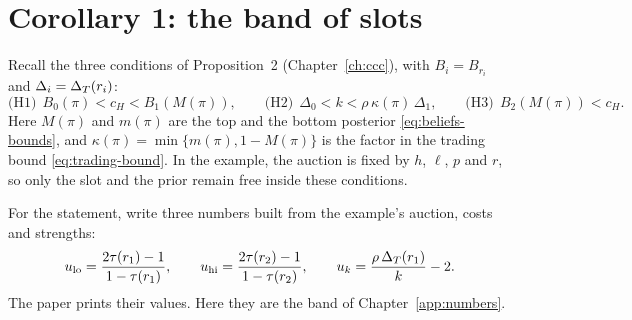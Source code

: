 \section{Corollary 1: the band of slots}\label{sec:example-corollary}

Recall the three conditions of Proposition~2 (Chapter~\ref{ch:ccc}), with \(B_i=B_{r_i}\) and
\(\Delta_i=\Delta_T(r_i)\):
\[
\text{(H1)}\ \ B_0(\pi)<c_H<B_1(M(\pi)),\qquad
\text{(H2)}\ \ \Delta_0<k<\rho\,\kappa(\pi)\,\Delta_1,\qquad
\text{(H3)}\ \ B_2(M(\pi))<c_H.
\]
Here \(M(\pi)\) and \(m(\pi)\) are the top and the bottom posterior \eqref{eq:beliefs-bounds}, and
\(\kappa(\pi)=\min\{m(\pi),1-M(\pi)\}\) is the factor in the trading bound \eqref{eq:trading-bound}. In the example,
the auction is fixed by \(h\), \(\ell\), \(p\) and \(r\), so only the slot and the prior remain free inside these
conditions.

For the statement, write three numbers built from the example's auction, costs and strengths:
\[
u_{\rm lo}=\frac{2\tau(r_1)-1}{1-\tau(r_1)},\qquad
u_{\rm hi}=\frac{2\tau(r_2)-1}{1-\tau(r_2)},\qquad
u_k=\frac{\rho\,\Delta_T(r_1)}{k}-2.
\]
The paper prints their values. Here they are the band of Chapter~\ref{app:numbers}.

